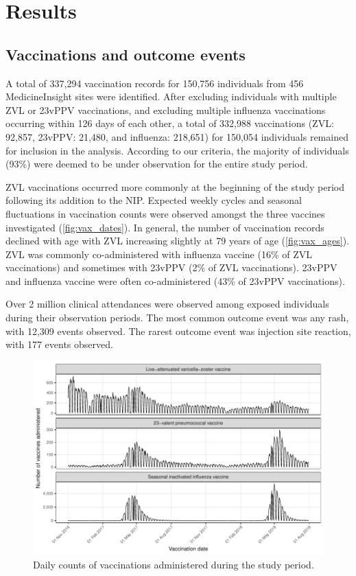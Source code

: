 \documentclass[review, endfloat]{elsarticle}
\begin{document}
\section{Results}

\subsection{Vaccinations and outcome events}

A total of 337,294 vaccination records for 150,756 individuals from 456 MedicineInsight sites were identified. After excluding individuals with multiple ZVL or 23vPPV vaccinations, and excluding multiple influenza vaccinations occurring within 126 days of each other, a total of 332,988 vaccinations (ZVL: 92,857, 23vPPV: 21,480, and influenza: 218,651) for 150,054 individuals remained for inclusion in the analysis. According to our criteria, the majority of individuals (93\%) were deemed to be under observation for the entire study period.

ZVL vaccinations occurred more commonly at the beginning of the study period following its addition to the NIP. Expected weekly cycles and seasonal fluctuations in vaccination counts were observed amongst the three vaccines investigated (\autoref{fig:vax_dates}). In general, the number of vaccination records declined with age with ZVL increasing slightly at 79 years of age (\autoref{fig:vax_ages}). ZVL was commonly co-administered with influenza vaccine (16\% of ZVL vaccinations) and sometimes with 23vPPV (2\% of ZVL vaccinations). 23vPPV and influenza vaccine were often co-administered (43\% of 23vPPV vaccinations).

Over 2 million clinical attendances were observed among exposed individuals during their observation periods. The most common outcome event was any rash, with 12,309 events observed. The rarest outcome event was injection site reaction, with 177 events observed.

\begin{figure}
\includegraphics{figs/exposure_time_series}
\caption{Daily counts of vaccinations administered during the study period.}
\label{fig:vax_dates}
\end{figure}
\end{document}
